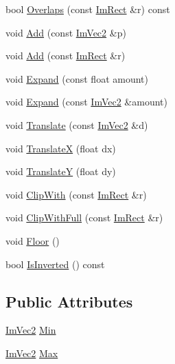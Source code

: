 \begin{DoxyCompactItemize}
\item 
bool \mbox{\hyperlink{struct_im_rect_a0af3bade3781e5e7c6afdf71ccfb0d43}{Overlaps}} (const \mbox{\hyperlink{struct_im_rect}{Im\+Rect}} \&r) const
\item 
void \mbox{\hyperlink{struct_im_rect_a68996cb6b16a023f0a051981cd5be89e}{Add}} (const \mbox{\hyperlink{struct_im_vec2}{Im\+Vec2}} \&p)
\item 
void \mbox{\hyperlink{struct_im_rect_ab07f581cc78eee99b42f40f77d9fac8e}{Add}} (const \mbox{\hyperlink{struct_im_rect}{Im\+Rect}} \&r)
\item 
void \mbox{\hyperlink{struct_im_rect_af33a7424c3341d08acd69da30c27c753}{Expand}} (const float amount)
\item 
void \mbox{\hyperlink{struct_im_rect_ac0b0b88fe65725b4694cd7d91d42d382}{Expand}} (const \mbox{\hyperlink{struct_im_vec2}{Im\+Vec2}} \&amount)
\item 
void \mbox{\hyperlink{struct_im_rect_a7f799afba3d1c61212448709d9e1a79b}{Translate}} (const \mbox{\hyperlink{struct_im_vec2}{Im\+Vec2}} \&d)
\item 
void \mbox{\hyperlink{struct_im_rect_a20c399583fc60a1f73715b3c6468a89d}{TranslateX}} (float dx)
\item 
void \mbox{\hyperlink{struct_im_rect_abb777eaa8fd13ad6b7d6dab56d29fe52}{TranslateY}} (float dy)
\item 
void \mbox{\hyperlink{struct_im_rect_ac02d5cf6ce0358aea9ed9df43d368f3f}{Clip\+With}} (const \mbox{\hyperlink{struct_im_rect}{Im\+Rect}} \&r)
\item 
void \mbox{\hyperlink{struct_im_rect_a32a5aaca4161b5ffa3f352d293a449ff}{Clip\+With\+Full}} (const \mbox{\hyperlink{struct_im_rect}{Im\+Rect}} \&r)
\item 
void \mbox{\hyperlink{struct_im_rect_a8fdf75a0c64ff29f65113cd9f8be77ab}{Floor}} ()
\item 
bool \mbox{\hyperlink{struct_im_rect_a140efca57832182e2483e5fe4ba50422}{Is\+Inverted}} () const
\end{DoxyCompactItemize}
\subsection*{Public Attributes}
\begin{DoxyCompactItemize}
\item 
\mbox{\hyperlink{struct_im_vec2}{Im\+Vec2}} \mbox{\hyperlink{struct_im_rect_af8f3fbf7ec983e03548b88e14ba68aa8}{Min}}
\item 
\mbox{\hyperlink{struct_im_vec2}{Im\+Vec2}} \mbox{\hyperlink{struct_im_rect_aad58c13340d320b350a72a037e3f7628}{Max}}
\end{DoxyCompactItemize}


